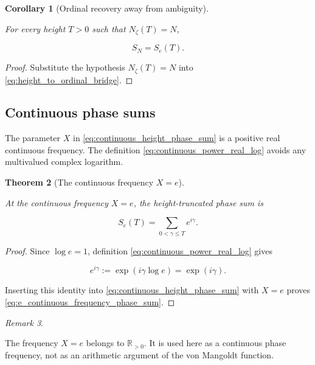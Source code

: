\documentclass[11pt]{amsart}
\numberwithin{equation}{section}
\theoremstyle{plain}
\newtheorem{theorem}{Theorem}[section]
\newtheorem{corollary}[theorem]{Corollary}
\theoremstyle{definition}
\theoremstyle{remark}
\newtheorem{remark}[theorem]{Remark}
\begin{document}
\begin{corollary}[Ordinal recovery away from ambiguity]
\label{cor:ordinal_recovery_from_height}

For every height \(T>0\) such that \(N_\zeta(T)=N\),

\begin{equation}
S_N=S_e(T).
\label{eq:ordinal_recovery_from_height}
\end{equation}

\end{corollary}

\begin{proof}
Substitute the hypothesis \(N_\zeta(T)=N\) into
\eqref{eq:height_to_ordinal_bridge}.
\end{proof}

\subsection{Continuous phase sums}
\label{subsec:continuous_phase_sums}

The parameter \(X\) in \eqref{eq:continuous_height_phase_sum} is a
positive real continuous frequency. The definition
\eqref{eq:continuous_power_real_log} avoids any multivalued complex
logarithm.

\begin{theorem}[The continuous frequency \(X=e\)]
\label{thm:e_continuous_frequency_phase}

At the continuous frequency \(X=e\), the height-truncated phase sum is

\begin{equation}
S_e(T)
=
\sum_{0<\gamma\leq T}e^{i\gamma}.
\label{eq:e_continuous_frequency_phase_sum}
\end{equation}

\end{theorem}

\begin{proof}
Since \(\log e=1\), definition \eqref{eq:continuous_power_real_log}
gives

\begin{equation}
e^{i\gamma}:=\exp(i\gamma\log e)=\exp(i\gamma).
\label{eq:e_phase_identity}
\end{equation}

Inserting this identity into \eqref{eq:continuous_height_phase_sum} with
\(X=e\) proves \eqref{eq:e_continuous_frequency_phase_sum}.
\end{proof}

\begin{remark}
\label{rem:continuous_not_arithmetic_frequency}

The frequency \(X=e\) belongs to \(\mathbb{R}_{>0}\). It is used here as
a continuous phase frequency, not as an arithmetic argument of the von
Mangoldt function.
\end{remark}
\end{document}
